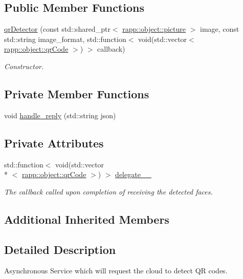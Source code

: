 \subsection*{Public Member Functions}
\begin{DoxyCompactItemize}
\item 
\hyperlink{classrapp_1_1cloud_1_1qrDetector_aec014d825c4cc07867efbc9ed68570eb}{qr\-Detector} (const std\-::shared\-\_\-ptr$<$ \hyperlink{classrapp_1_1object_1_1picture}{rapp\-::object\-::picture} $>$ image, const std\-::string image\-\_\-format, std\-::function$<$ void(std\-::vector$<$ \hyperlink{classrapp_1_1object_1_1qrCode}{rapp\-::object\-::qr\-Code} $>$) $>$ callback)
\begin{DoxyCompactList}\small\item\em Constructor. \end{DoxyCompactList}\end{DoxyCompactItemize}
\subsection*{Private Member Functions}
\begin{DoxyCompactItemize}
\item 
void \hyperlink{classrapp_1_1cloud_1_1qrDetector_ae604fb59970ea287bff8be0fc8c5eb4c}{handle\-\_\-reply} (std\-::string json)
\end{DoxyCompactItemize}
\subsection*{Private Attributes}
\begin{DoxyCompactItemize}
\item 
std\-::function$<$ void(std\-::vector\\*
$<$ \hyperlink{classrapp_1_1object_1_1qrCode}{rapp\-::object\-::qr\-Code} $>$) $>$ \hyperlink{classrapp_1_1cloud_1_1qrDetector_a5a835964ee4db7bac1fe7412d242c445}{delegate\-\_\-\-\_\-}
\begin{DoxyCompactList}\small\item\em The callback called upon completion of receiving the detected faces. \end{DoxyCompactList}\end{DoxyCompactItemize}
\subsection*{Additional Inherited Members}


\subsection{Detailed Description}
Asynchronous Service which will request the cloud to detect Q\-R codes. 

